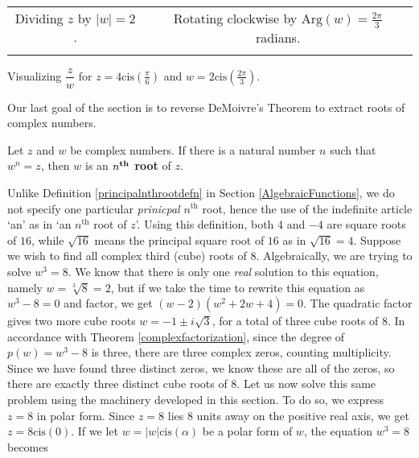 \begin{center}
\begin{tabular}{cc}
{\scriptsize Dividing $z$ by $|w| = 2$}. &

\hspace{.5in} {\scriptsize Rotating clockwise by $\text{Arg}(w) = \frac{2\pi}{3}$ radians.} \\

& \\

\end{tabular}


{\scriptsize Visualizing $\dfrac{z}{w}$ for $z = 4\text{cis}\left(\frac{\pi}{6}\right)$ and $w = 2 \text{cis}\left(\frac{2\pi}{3}\right)$.}

\end{center}

Our last goal of the section is to reverse DeMoivre's Theorem to extract roots of complex numbers.

\smallskip

\colorbox{ResultColor}{\bbm

\begin{defn} \label{nthrootcomplex} Let $z$ and $w$ be complex numbers.  If there is a natural number $n$ such that $w^{n} = z$, then $w$ is an \textbf{\boldmath $n^{\mbox{\textbf{\scriptsize th}}}$ root} of $z$.   


\end{defn}

\ebm}

\smallskip

Unlike Definition \ref{principalnthrootdefn} in Section \ref{AlgebraicFunctions}, we do not specify one particular \textit{prinicpal} $n^{\text{th}}$ root, hence the use of the indefinite article `an' as in `an $n^{\text{th}}$ root of $z$'.  Using this definition, both $4$ and $-4$ are square roots of $16$, while $\sqrt{16}$ means the principal square root of $16$ as in $\sqrt{16}= 4$.  Suppose we wish to find all complex third (cube) roots of $8$.  Algebraically, we are trying to solve $w^{3} = 8$.  We know that there is only one \textit{real} solution to this equation, namely $w = \sqrt[3]{8} = 2$, but if we take the time to rewrite this equation as $w^3 - 8 = 0$ and factor, we get $(w-2)\left(w^2 + 2w + 4\right) = 0$.  The quadratic factor gives two more cube roots $w = -1 \pm i \sqrt{3}$, for a total of three cube roots of $8$. In accordance with Theorem \ref{complexfactorization}, since the degree of $p(w) = w^3 -8$ is three, there are three complex zeros, counting multiplicity.  Since we have found three distinct zeros, we know these are all of the zeros, so there are exactly three distinct cube roots of $8$.  Let us now solve this same problem using the machinery developed in this section.  To do so, we express $z = 8$ in polar form. Since $z=8$ lies $8$ units away on the positive real axis, we get $z = 8 \text{cis}(0)$.  If we let $w = |w| \text{cis}(\alpha)$ be a polar form of $w$, the equation $w^3 = 8$ becomes

